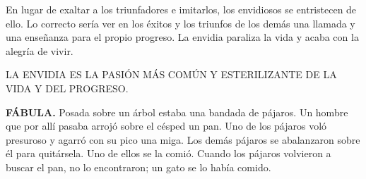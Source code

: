 \documentclass[10pt,twoside]{article}
\begin{document}
En lugar de exaltar a los triunfadores e imitarlos, los envidiosos se entristecen de ello. Lo correcto sería ver en los éxitos y los triunfos de los demás una llamada y una enseñanza
para el propio progreso. La envidia paraliza la vida y acaba con la alegría de vivir.\\
\begin{center}
LA ENVIDIA ES LA PASIÓN MÁS COMÚN Y ESTERILIZANTE DE LA VIDA Y DEL PROGRESO.
\end{center}
\textbf{FÁBULA.} Posada sobre un árbol estaba una bandada de pájaros. Un hombre que por allí pasaba arrojó sobre el césped un pan. Uno de los pájaros voló presuroso y agarró con su pico una miga. Los demás pájaros se abalanzaron sobre él para quitársela. Uno de ellos se la comió. Cuando los pájaros volvieron a buscar el pan, no lo encontraron; un gato se lo había comido.
\end{document}
